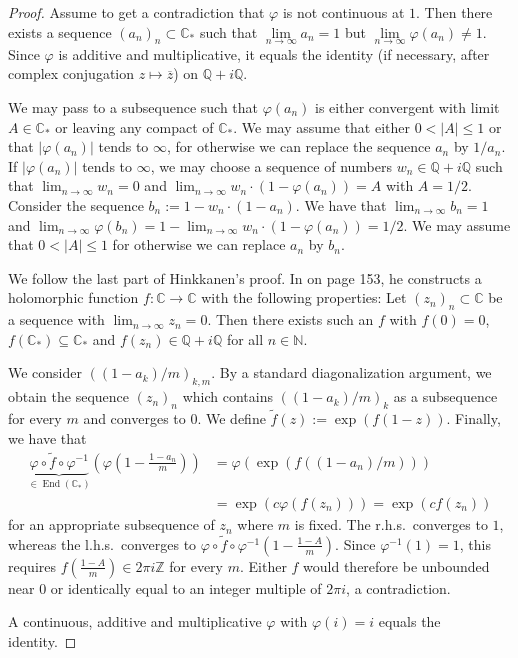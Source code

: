 \documentclass[a4paper,12pt]{amsart}
\newcommand{\NN}{\mathbb{N}}
\newcommand{\ZZ}{\mathbb{Z}}
\newcommand{\QQ}{\mathbb{Q}}
\newcommand{\CC}{\mathbb{C}}
\DeclareMathOperator{\enmo}{End}
\theoremstyle{definition}
\begin{document}
\begin{proof}
Assume to get a contradiction that $\varphi$ is not continuous at $1$. Then there exists a sequence $(a_n)_n \subset \CC_\ast$ such that $\lim\limits_{n \to \infty} a_n = 1$ but $\lim\limits_{n \to \infty} \varphi(a_n) \neq 1$. Since $\varphi$ is additive and multiplicative, it equals the identity (if necessary, after complex conjugation $z \mapsto \overline{z}$) on $\QQ + i \QQ$. 

We may pass to a subsequence such that $\varphi(a_n)$ is either convergent with limit $A \in \CC_\ast$ or leaving any compact of $\CC_\ast$. We may assume that either $0 < |A| \leq 1$ or that $|\varphi(a_n)|$ tends to $\infty$, for otherwise we can replace the sequence $a_n$ by $1/a_n$. If  $|\varphi(a_n)|$ tends to $\infty$, we may choose a sequence of numbers $w_n \in \QQ + i \QQ$ such that $\lim_{n \to \infty} w_n = 0$ and $\lim_{n \to \infty} w_n \cdot (1 - \varphi(a_n)) = A$ with $A = 1/2$. Consider the sequence $b_n := 1 - w_n \cdot (1 - a_n)$. We have that $\lim_{n \to \infty} b_n = 1$ and $\lim_{n \to \infty} \varphi(b_n) = 1 -  \lim_{n \to \infty} w_n \cdot (1 - \varphi(a_n)) = 1/2$. We may assume that $0 < |A| \leq 1$ for otherwise we can replace $a_n$ by $b_n$.

We follow the last part of Hinkkanen's proof. In \cite{00126289} on page 153, he constructs a holomorphic function $f \colon \CC \to \CC$ with the following properties: Let $(z_n)_n \subset \CC$ be a sequence with $\lim_{n \to \infty} z_n = 0$. Then there exists such an $f$ with $f(0) = 0$, $f(\CC_\ast) \subseteq \CC_\ast$ and $f(z_n) \in \QQ + i \QQ$ for all $n \in \NN$.

We consider $((1 - a_k)/m)_{k, m}$. By a standard diagonalization argument, we obtain the sequence $(z_n)_n$ which contains $((1 - a_k)/m)_{k}$ as a subsequence for every $m$ and converges to $0$. 
We define $\widetilde{f}(z) := \exp(f(1 - z))$. Finally, we have that
\begin{align*}
\underbrace{\varphi \circ \widetilde{f} \circ \varphi^{-1}}_{\in \enmo(\CC_\ast)}\left(\varphi\left(1-\frac{1-a_n}{m}\right)\right) &= \varphi(\exp(f((1 - a_n)/m))) \\
 &= \exp(c\varphi(f(z_n))) = \exp(cf(z_n))
\end{align*}
for an appropriate subsequence of $z_n$ where $m$ is fixed. 
The r.h.s.\ converges to $1$, whereas the l.h.s.\ converges to $\varphi \circ \widetilde{f} \circ \varphi^{-1}\left(1-\frac{1 - A}{m}\right)$. Since $\varphi^{-1}(1) = 1$, this requires 
$f\left(\frac{1 - A}{m}\right) \in 2 \pi i \ZZ$ for every $m$. Either $f$ would therefore be unbounded near $0$ or identically equal to an integer multiple of $2 \pi i$, a contradiction. 

A continuous, additive and multiplicative $\varphi$ with $\varphi(i) = i$ equals the identity. 
\end{proof}
\end{document}
